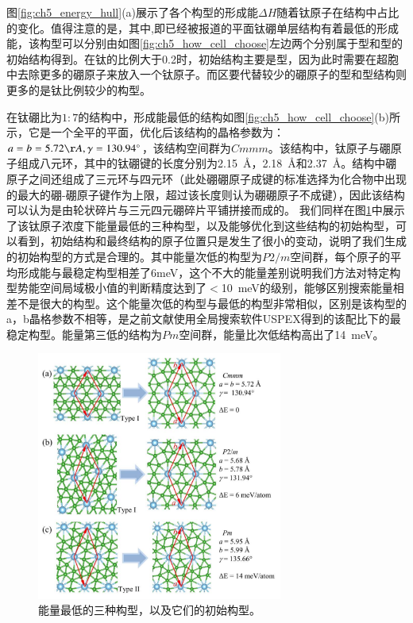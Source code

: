 图\ref{fig:ch5_energy_hull}(a)展示了各个构型的形成能$\Delta H$随着钛原子在结构中占比的变化。值得注意的是，其中,即已经被报道的平面钛硼单层结构有着最低的形成能，该构型可以分别由如图\ref{fig:ch5_how_cell_choose}左边两个分别属于型和型的初始结构得到。在钛的比例大于\num{0.2}时，初始结构主要是型，因为此时需要在超胞中去除更多的硼原子来放入一个钛原子。而区要代替较少的硼原子的型和型结构则更多的是钛比例较少的构型。

在钛硼比为$1:7$的结构中，形成能最低的结构如图\ref{fig:ch5_how_cell_choose}(b)所示，它是一个全平的平面，优化后该结构的晶格参数为：$a=b=5.72\AA,\gamma=130.94^{\circ}$，该结构空间群为$Cmmm$。该结构中，钛原子与硼原子组成八元环，其中的钛硼键的长度分别为\SI{2.15}{\angstrom}，\SI{2.18}{\angstrom}和\SI{2.37}{\angstrom}。结构中硼原子之间还组成了三元环与四元环（此处硼硼原子成键的标准选择为化合物中出现的最大的硼-硼原子键作为上限，超过该长度则认为硼硼原子不成键），因此该结构可以认为是由轮状碎片与三元四元硼碎片平铺拼接而成的。
我们同样在图\ref{fig:ch5_tib7_last3}中展示了该钛原子浓度下能量最低的三种构型，以及能够优化到这些结构的初始构型，可以看到，初始结构和最终结构的原子位置只是发生了很小的变动，说明了我们生成的初始构型的方式是合理的。其中能量次低的构型为$P2/m$空间群，每个原子的平均形成能与最稳定构型相差了6meV，这个不大的能量差别说明我们方法对特定构型势能空间局域极小值的判断精度达到了$<$\SI{10}{\meV}的级别，能够区别搜索能量相差不是很大的构型。这个能量次低的构型与最低的构型非常相似，区别是该构型的a，b晶格参数不相等，是之前文献使用全局搜索软件USPEX得到的该配比下的最稳定构型。能量第三低的结构为$Pm$空间群，能量比次低结构高出了\SI{14}{\meV}。

\begin{figure}
  \includegraphics[width=0.72\textwidth]{figs/ch5_tib7_last3.png}
  \centering
  \caption{能量最低的三种构型，以及它们的初始构型。}
  \label{fig:ch5_tib7_last3}
\end{figure}


